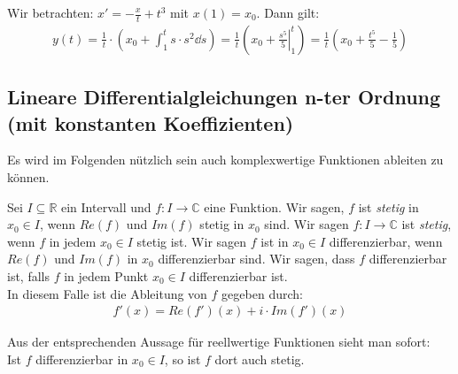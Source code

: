\begin{Beispiel}{
	Wir betrachten: $x' = -\frac{x}{t} + t^3$ mit $x(1) = x_0$. Dann gilt:
	\begin{align*}
		y(t) = \frac{1}{t}\cdot\left(x_0 + \int_1^t s \cdot s^2 \dd{s} \right)
		= \frac{1}{t} \left(x_0 + \left.\frac{s^5}{5}\right\vert_1^t\right)
		= \frac{1}{t}\left(x_0 + \frac{t^5}{5} - \frac{1}{5}\right)
	\end{align*}
}\end{Beispiel}

\subsection{Lineare Differentialgleichungen n-ter Ordnung (mit konstanten Koeffizienten)}
Es wird im Folgenden nützlich sein auch komplexwertige Funktionen ableiten zu können.

\begin{Definition}{
	Sei $I \subseteq \mathbb{R}$ ein Intervall und $f: I \rightarrow \mathbb{C}$ 
	eine Funktion. Wir sagen, $f$ ist \emph{stetig} in $x_0 \in I$, wenn 
	$Re(f)$ und $Im(f)$ stetig in $x_0$ sind. Wir sagen $f: I \rightarrow \mathbb{C} 
	$ ist \emph{stetig}, wenn $f$ in jedem $x_0 \in I$ stetig ist. Wir sagen 
	$f$ ist in $x_0 \in I$ differenzierbar, wenn $Re(f)$ und $Im(f)$ in $x_0$
	 differenzierbar sind. Wir sagen, dass $f$ differenzierbar ist, falls $f$ in 
	 jedem Punkt $x_0 \in I$ differenzierbar ist.\\
	 In diesem Falle ist die Ableitung von $f$ gegeben durch:
	 \begin{align*}
	 f'(x) = Re(f')(x) +i \cdot  Im(f') (x)
	 \end{align*}
}\end{Definition}

\begin{Bemerkung}{
	Aus der entsprechenden Aussage für reellwertige Funktionen sieht man sofort: \\
	Ist $f$ differenzierbar in $x_0 \in I$, so ist $f$ dort auch stetig.
}\end{Bemerkung}

